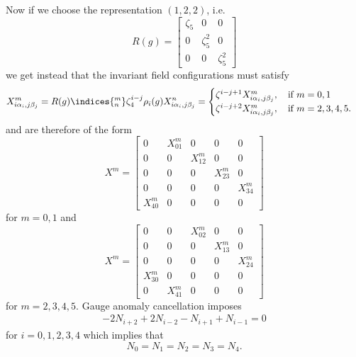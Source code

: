 \documentclass{worksheetclass}
\begin{document}
            Now if we choose the representation $(1,2,2)$, i.e.
            \begin{equation}
                R(g)=
                \begin{bmatrix}
                    \zeta_5 & 0 & 0\\
                    0 & \zeta^2_5 & 0\\
                    0 & 0 & \zeta^2_5
                \end{bmatrix}
            \end{equation}
            we get instead that the invariant field configurations must satisfy
            \begin{equation}
                X^m_{i\alpha_i,j\beta_j} = R(g)\indices{^m_n}\zeta^{i-j}_4\rho_i(g)X^n_{i\alpha_i,j\beta_j} =
                \begin{cases}
                    \zeta^{i-j+1}X^m_{i\alpha_i,j\beta_j},\quad\text{if } m=0,1\\
                    \zeta^{i-j+2}X^m_{i\alpha_i,j\beta_j},\quad\text{if } m=2,3,4,5.
                \end{cases}
            \end{equation}
            and are therefore of the form
            \begin{equation}
                X^m = 
                \begin{bmatrix}
                    0 & X^m_{01} & 0 & 0 & 0\\
                    0 & 0 & X^m_{12} & 0 & 0\\
                    0 & 0 & 0 & X^m_{23} & 0\\
                    0 & 0 & 0 & 0 & X^m_{34}\\
                    X^m_{40} & 0 & 0 & 0 & 0
                \end{bmatrix}
            \end{equation}
            for $m=0,1$ and 
            \begin{equation}
                X^m = 
                \begin{bmatrix}
                    0 & 0 &  X^m_{02} & 0 & 0\\
                    0 & 0 & 0 &  X^m_{13} & 0\\
                    0 & 0 & 0 & 0 &  X^m_{24}\\
                    X^m_{30} & 0 & 0 & 0 & 0\\
                    0 &  X^m_{41} & 0 & 0 & 0
                \end{bmatrix}
            \end{equation}
            for $m=2,3,4,5$. Gauge anomaly cancellation imposes
            \begin{align}
                -2N_{i+2}+2N_{i-2}-N_{i+1}+N_{i-1}=0
            \end{align}
            for $i=0,1,2,3,4$ which implies that
            \begin{equation}
                N_0=N_1=N_2=N_3=N_4.
            \end{equation}
\end{document}
